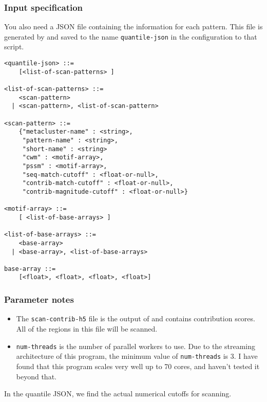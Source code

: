 \documentclass{article}
\begin{document}
\subsubsection{Input specification}



You also need a JSON file containing the information for each pattern.
This file is generated by  and saved to the name
\texttt{quantile-json} in the configuration to that script.

\begin{lstlisting}
<quantile-json> ::=
    [<list-of-scan-patterns> ]

<list-of-scan-patterns> ::=
    <scan-pattern>
  | <scan-pattern>, <list-of-scan-pattern>

<scan-pattern> ::=
    {"metacluster-name" : <string>,
     "pattern-name" : <string>,
     "short-name" : <string>
     "cwm" : <motif-array>,
     "pssm" : <motif-array>,
     "seq-match-cutoff" : <float-or-null>,
     "contrib-match-cutoff" : <float-or-null>,
     "contrib-magnitude-cutoff" : <float-or-null>}

<motif-array> ::=
    [ <list-of-base-arrays> ]

<list-of-base-arrays> ::=
    <base-array>
  | <base-array>, <list-of-base-arrays>

base-array ::=
    [<float>, <float>, <float>, <float>]
\end{lstlisting}


\subsubsection{Parameter notes}
\begin{itemize}
    \item The \texttt{scan-contrib-h5} file is the output of 
        and contains contribution scores.
        All of the regions in this file will be scanned.
    \item \texttt{num-threads} is the number of parallel workers to use.
        Due to the streaming architecture of this program, the minimum value of \texttt{num-threads} is 3.
        I have found that this program scales very well up to 70 cores,
        and haven't tested it beyond that.
\end{itemize}

In the quantile JSON, we find the actual numerical cutoffs for scanning.
\end{document}
